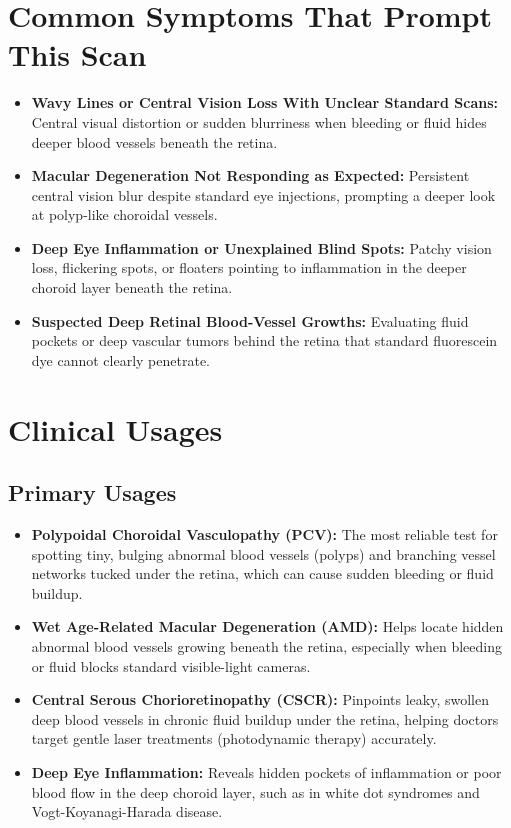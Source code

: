 \section{Common Symptoms That Prompt This Scan}
\begin{itemize}
    \item \textbf{Wavy Lines or Central Vision Loss With Unclear Standard Scans:} Central visual distortion or sudden blurriness when bleeding or fluid hides deeper blood vessels beneath the retina.
    \item \textbf{Macular Degeneration Not Responding as Expected:} Persistent central vision blur despite standard eye injections, prompting a deeper look at polyp-like choroidal vessels.
    \item \textbf{Deep Eye Inflammation or Unexplained Blind Spots:} Patchy vision loss, flickering spots, or floaters pointing to inflammation in the deeper choroid layer beneath the retina.
    \item \textbf{Suspected Deep Retinal Blood-Vessel Growths:} Evaluating fluid pockets or deep vascular tumors behind the retina that standard fluorescein dye cannot clearly penetrate.
\end{itemize}

\section{Clinical Usages}

\subsection{Primary Usages}

\begin{itemize}
    \item \textbf{Polypoidal Choroidal Vasculopathy (PCV):} The most reliable test for spotting tiny, bulging abnormal blood vessels (polyps) and branching vessel networks tucked under the retina, which can cause sudden bleeding or fluid buildup.
    \item \textbf{Wet Age-Related Macular Degeneration (AMD):} Helps locate hidden abnormal blood vessels growing beneath the retina, especially when bleeding or fluid blocks standard visible-light cameras.
    \item \textbf{Central Serous Chorioretinopathy (CSCR):} Pinpoints leaky, swollen deep blood vessels in chronic fluid buildup under the retina, helping doctors target gentle laser treatments (photodynamic therapy) accurately.
    \item \textbf{Deep Eye Inflammation:} Reveals hidden pockets of inflammation or poor blood flow in the deep choroid layer, such as in white dot syndromes and Vogt-Koyanagi-Harada disease.
\end{itemize}


